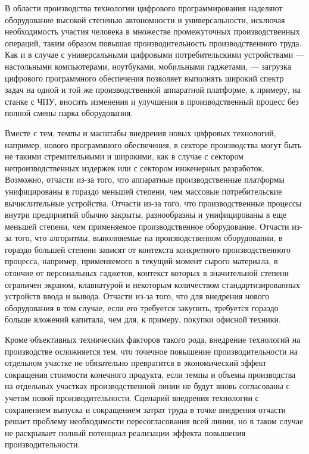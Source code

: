 \documentclass{article}
\begin{document}
В области производства технологии цифрового программирования наделяют оборудование высокой степенью автономности и универсальности, исключая необходимость участия человека в множестве промежуточных производственных операций, таким образом повышая производительность производственного труда. Как и в случае с универсальными цифровыми потребительскими устройствами — настольными компьютерами, ноутбуками, мобильными гаджетами, — загрузка цифрового программного обеспечения позволяет выполнять широкий спектр задач на одной и той же производственной аппаратной платформе, к примеру, на станке с ЧПУ, вносить изменения и улучшения в производственный процесс без полной смены парка оборудования.

Вместе с тем, темпы и масштабы внедрения новых цифровых технологий, например, нового программного обеспечения, в секторе производства могут быть не такими стремительными и широкими, как в случае с сектором непроизводственных издержек или с сектором инженерных разработок. Возможно, отчасти из-за того, что аппаратные производственные платформы унифицированы в гораздо меньшей степени, чем массовые потребительские вычислительные устройства. Отчасти из-за того, что производственные процессы внутри предприятий обычно закрыты, разнообразны и унифицированы в еще меньшей степени, чем применяемое производственное оборудование. Отчасти из-за того, что алгоритмы, выполняемые на производственном оборудовании, в гораздо большей степени зависят от контекста конкретного производственного процесса, например, применяемого в текущий момент сырого материала, в отличие от персональных гаджетов, контекст которых в значительной степени ограничен экраном, клавиатурой и некоторым количеством стандартизированных устройств ввода и вывода. Отчасти из-за того, что для внедрения нового оборудования в том случае, если его требуется закупить, требуется гораздо больше вложений капитала, чем для, к примеру, покупки офисной техники.

Кроме объективных технических факторов такого рода, внедрение технологий на производстве осложняется тем, что точечное повышение производительности на отдельном участке не обязательно превратится в экономический эффект сокращения стоимости конечного продукта, если темпы и объемы производства на отдельных участках производственной линии не будут вновь согласованы с учетом новой производительности. Сценарий внедрения технологии с сохранением выпуска и сокращением затрат труда в точке внедрения отчасти решает проблему необходимости пересогласования всей линии, но в таком случае не раскрывает полный потенциал реализации эффекта повышения производительности.
\end{document}
